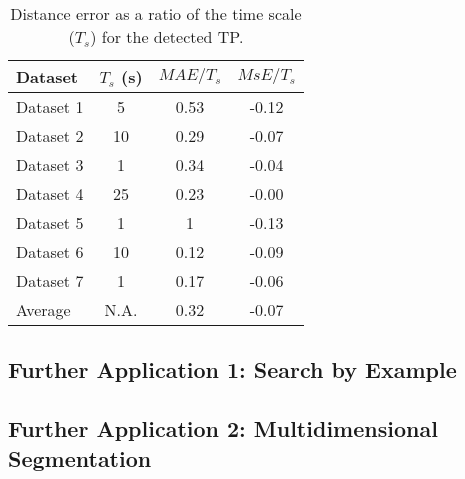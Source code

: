 \begin{table}
	\begin{center}
        \begin{tabular}{lccc}
            \toprule
			Dataset & $T_s$ (s) & $MAE/T_s$ & $MsE/T_s$ \\
			\toprule
			Dataset 1 & 5 & 0.53 & -0.12 \\
			Dataset 2 & 10 & 0.29 & -0.07 \\
			Dataset 3 & 1 & 0.34 & -0.04 \\
			Dataset 4 & 25 & 0.23 & -0.00 \\
			Dataset 5 & 1 & 1 & -0.13 \\
			Dataset 6 & 10 & 0.12 & -0.09 \\
			Dataset 7 & 1 & 0.17 & -0.06 \\
			\midrule
			Average & N.A. & 0.32 & -0.07 \\
			\bottomrule
		\end{tabular}
	\end{center}
	\caption{Distance error as a ratio of the time scale ($T_s$) for the detected TP.}
	\label{tab:overall_cpd_dist}
\end{table}

\subsection{Further Application 1: Search by Example}

\subsection{Further Application 2: Multidimensional Segmentation}

